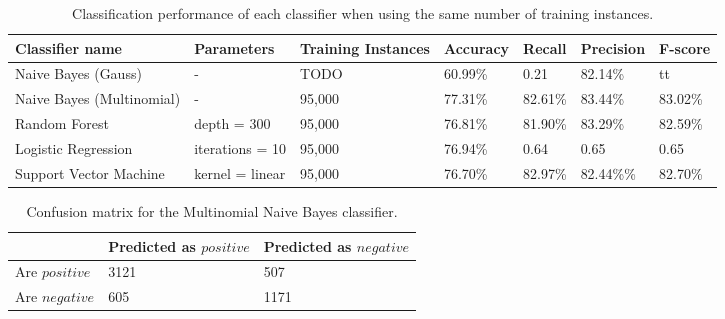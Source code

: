 \begin{table}
\centering
\caption{Classification performance of each classifier when using the same number of training instances.}
\begin{tabular}{ |p{3cm}||p{3cm}|p{2cm}|p{1.5cm}|p{1.5cm}|p{1.5cm}|p{1.5cm}| }
 \hline
 Classifier name &          Parameters &             Training Instances &    Accuracy &      Recall &     Precision& F-score \\
 \hline
 Naive Bayes (Gauss)        &-&     TODO&                 60.99\%&        0.21&       82.14\%& tt\\
  \hline
 Naive Bayes (Multinomial)  &-&     95,000& 77.31\%&        82.61\%&       83.44\%& 83.02\%\\
  \hline
 Random Forest              &depth = 300&            95,000&76.81\%&  81.90\%&     83.29\%& 82.59\%\\
  \hline
 Logistic Regression        &iterations = 10&            95,000&                 76.94\%&        0.64&       0.65& 0.65\\
  \hline
 Support Vector Machine     &kernel = linear&   95,000&     76.70\%& 82.97\%&  82.44\%\%& 82.70\%\\
 \hline
\end{tabular}
\label{tab:evaluations_euqal}
\end{table}
\begin{table}
\centering
\caption{Confusion matrix for the Multinomial Naive Bayes classifier.}
\begin{tabular}{ |p{3cm}||p{3cm}|p{3cm}| }
 \hline
  &          Predicted as $positive$ &Predicted as $negative$  \\
 \hline
 Are $positive$        & 3121&            507\\
  \hline
 Are $negative$  &605&                     1171\\
 \hline

\end{tabular}
\label{tab:evaluations_conf}
\end{table}


